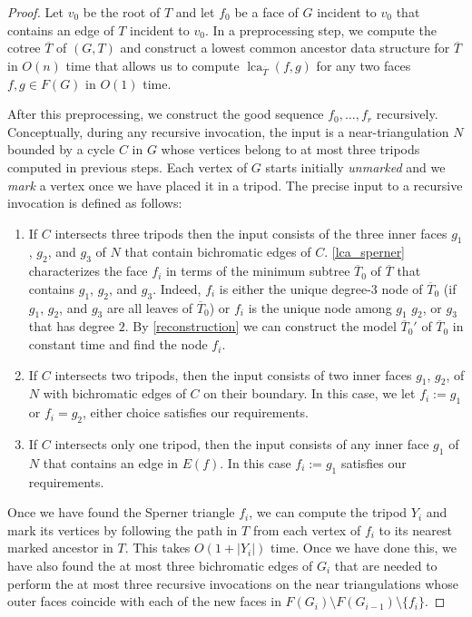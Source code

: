 \documentclass{patmorin}
\DeclareMathOperator{\lca}{lca}
\begin{document}
\begin{proof}
  Let $v_0$ be the root of $T$ and let $f_0$ be a face of $G$ incident to $v_0$ that contains an edge of $T$ incident to $v_0$.  In a preprocessing step, we compute the cotree $\overline{T}$ of $(G,T)$ and construct a lowest common ancestor data structure for $\overline{T}$ in $O(n)$ time that allows us to compute $\lca_{\overline{T}}(f,g)$ for any two faces $f,g\in F(G)$ in $O(1)$ time.

  After this preprocessing, we construct the good sequence $f_0,\ldots,f_{r}$ recursively. Conceptually, during any recursive invocation, the input is a near-triangulation $N$ bounded by a cycle $C$ in $G$ whose vertices belong to at most three tripods computed in previous steps.  Each vertex of $G$ starts initially \emph{unmarked} and we \emph{mark} a vertex once we have placed it in a tripod.  The precise input to a recursive invocation is defined as follows:
  \begin{enumerate}
    \item If $C$ intersects three tripods then the input consists of the three inner faces $g_1$, $g_2$, and $g_3$ of $N$ that contain bichromatic edges of $C$.  \cref{lca_sperner} characterizes the face $f_i$ in terms of the minimum subtree $\overline{T}_0$ of $\overline{T}$ that contains $g_1$, $g_2$, and $g_3$.  Indeed, $f_i$ is either the unique degree-$3$ node of $\overline{T}_0$ (if $g_1$, $g_2$, and $g_3$ are all leaves of $\overline{T}_0$) or $f_i$ is the unique node among $g_1$ $g_2$, or $g_3$ that has degree $2$.  By \cref{reconstruction} we can construct the model $\overline{T}_0'$ of $\overline{T}_0$ in constant time and find the node $f_i$.

    \item If $C$ intersects two tripods, then the input consists of two inner faces $g_1$, $g_2$, of $N$ with bichromatic edges of $C$ on their boundary.  In this case, we let $f_i:=g_1$ or $f_i=g_2$, either choice satisfies our requirements.

    \item If $C$ intersects only one tripod, then the input consists of any inner face $g_1$ of $N$ that contains an edge in $E(f)$.  In this case $f_i:=g_1$ satisfies our requirements.
\end{enumerate}
Once we have found the Sperner triangle $f_i$, we can compute the tripod $Y_i$ and mark its vertices by following the path in $T$ from each vertex of $f_i$ to its nearest marked ancestor in $T$.  This takes $O(1+|Y_i|)$ time.  Once we have done this, we have also found the at most three bichromatic edges of $G_i$ that are needed to perform the at most three recursive invocations on the near triangulations whose outer faces coincide with each of the new faces in $F(G_i)\setminus F(G_{i-1})\setminus\{f_i\}$.


\end{proof}
\end{document}

